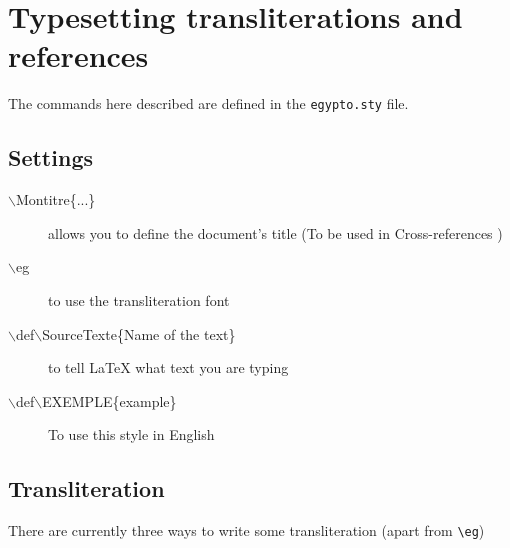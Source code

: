 \documentclass[final]{article}
\def\Backslash{$\backslash$}
\begin{document}
\section{Typesetting transliterations and references}
The commands here described are defined in the \verb=egypto.sty= file.

\subsection{Settings}

\begin{description}
  \item[\Backslash Montitre\{...\}] allows you to define the document's title 
 (To be used in Cross-references )

 \item[\Backslash eg] to use the transliteration font

 \item[\Backslash def\Backslash SourceTexte\{Name of the text\}] to tell LaTeX what
text you are  typing

\item[\Backslash def\Backslash EXEMPLE\{example\}] To use this style in English

\end{description}

\subsection{Transliteration}

 There are currently three ways to write some transliteration
 (apart from \verb/\eg/)
\end{document}
